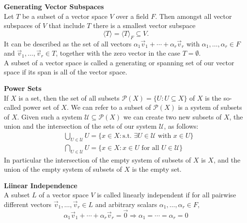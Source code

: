 \documentclass[a4paper, 10pt]{article}
\begin{document}
\begin{multicols*}{3}
\textbf{Generating Vector Subspaces}\\
Let $T$ be a subset of a vector space $V$ over a field $F$. Then amongst all vector subspaces of $V$ that include $T$ there is a smallest vector subspace
$$
\langle T\rangle= \langle T\rangle_F \subseteq V .
$$
It can be described as the set of all vectors $\alpha_1 \vec{v}_1+\cdots+\alpha_r \vec{v}_r$ with $\alpha_1, \ldots, \alpha_r \in F$ and $\vec{v}_1, \ldots, \vec{v}_r \in T$, together with the zero vector in the case $T=\emptyset$.\\
A subset of a vector space is called a generating or spanning set of our vector space if its span is all of the vector space.

\textbf{Power Sets}\\
If $X$ is a set, then the set of all subsets $\mathcal{P}(X)=\{U: U \subseteq X\}$ of $X$ is the so-called power set of $X$. 
We can refer to a subset of $\mathcal{P}(X)$ is a system of subsets of $X$. 
Given such a system $\mathcal{U} \subseteq \mathcal{P}(X)$ we can create two new subsets of $X$, the union and the intersection of the sets of our system $\mathcal{U}$, as follows:
\begin{align*}
& \bigcup_{U \in \mathcal{U}} U=\{x \in X: \text {s.t. } \exists U \in \mathcal{U} \text { with } x \in U\} \\
& \bigcap_{U \in \mathcal{U}} U=\{x \in X: x \in U \text { for all } U \in \mathcal{U}\}
\end{align*}
In particular the intersection of the empty system of subsets of $X$ is $X$, and the union of the empty system of subsets of $X$ is the empty set.

\textbf{Liinear Independence}\\
A subset $L$ of a vector space $V$ is called linearly independent if for all pairwise different vectors $\vec{v}_1, \ldots, \vec{v}_r \in L$ and arbitrary scalars $\alpha_1, \ldots, \alpha_r \in F$,
$$
\alpha_1 \vec{v}_1+\cdots+\alpha_r \vec{v}_r=\overrightarrow{0} \Longrightarrow \alpha_1=\cdots=\alpha_r=0
$$


\end{multicols*}
\end{document}
